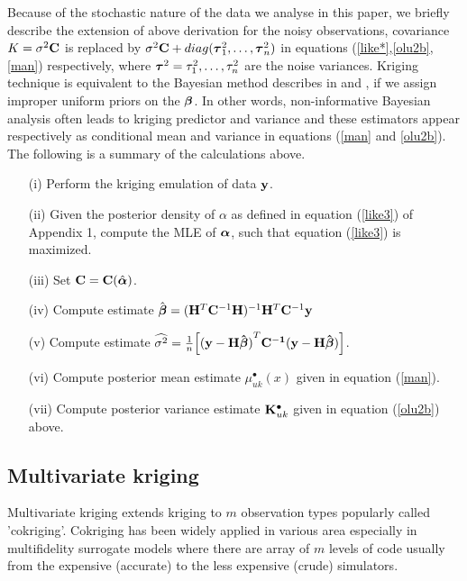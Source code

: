 Because of the stochastic nature of the data we analyse in this paper, we briefly describe the extension of above derivation for the noisy observations, covariance $K=\sigma^2{\bf C}$ is replaced by $ \sigma^2{\bf C}+diag({{\boldsymbol{\tau}}}^2_1,\ldots,{{\boldsymbol{\tau}}}^2_n)$ in equations (\ref{like*},\ref{olu2b},\ref{man}) respectively, where ${{\boldsymbol{\tau}}}^2=\tau^2_1,\ldots,\tau^2_n$ are the noise variances. Kriging technique is equivalent to the Bayesian method describes in \citet{pd10} and \citet{q35}, if we assign improper uniform priors on the ${\boldsymbol{\beta}}$. In other words, non-informative Bayesian analysis often leads to kriging predictor and variance and these estimators appear respectively as conditional mean and variance in equations (\ref{man} and \ref{olu2b}). The following is a summary of the calculations above.
\begin{itemize}
\item[{(i)}] Perform the kriging emulation of data ${\bf y}$. 
\item[{(ii)}] Given the posterior density of $\alpha$ as defined in equation (\ref{like3}) of Appendix 1, compute the MLE of ${\boldsymbol{\alpha}}$, such that equation (\ref{like3}) is maximized.
\item[{(iii)}] Set ${\bf C}= {\bf C}({\hat{\boldsymbol{\alpha}}})$.
\item[{(iv)}] Compute estimate ${\hat{\boldsymbol{\beta}}}=({\bf H}^T{\bf C}^{-1}{\bf H})^{-1}{\bf H}^T{\bf C}^{-1}{\bf y}$
\item[{(v)}] Compute estimate $\widehat{\sigma^2}=\frac{1}{n}\Big[\mathbf{(y-H\hat{\boldsymbol \beta})}^T\bf C^{-1}(\bf y-H\hat{\boldsymbol \beta})\Big]$.
\item[{(vi)}] Compute posterior mean estimate $\mu^{\bullet}_{uk}(x)$ given in equation (\ref{man}).
\item[{(vii)}] Compute posterior variance estimate ${\mathbf{K}}^{\bullet}_{uk}$ given in equation (\ref{olu2b}) above.
\end{itemize}

\subsection{Multivariate kriging}
Multivariate kriging extends kriging to $m$ observation types popularly called 'cokriging'. Cokriging has been widely
applied in various area especially in multifidelity surrogate models \citep{co3,co5} where there are array of $m$ levels of code usually from the expensive (accurate) to the less expensive (crude) simulators.

